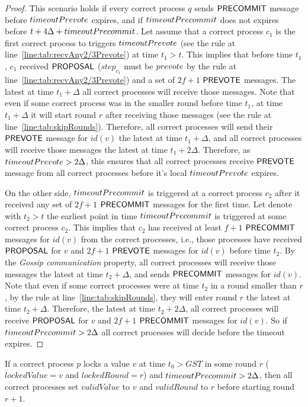 \begin{proof}
This scenario holds if every correct process $q$ sends $\mathsf{PRECOMMIT}$ message before $timeoutPrevote$ expires, and if $timeoutPrecommit$ does not expires before $t + 4\Delta + timeoutPrecommit$. 
Let assume that a correct process $c_1$ is the first correct process to triggers $timeoutPrevote$ (see the rule at line~\ref{line:tab:recvAny2/3Prevote}) at time $t_1 > t$. This implies that before time $t_1$, $c_1$ received $\mathsf{PROPOSAL}$ ($step_{c_1}$ must be $prevote$ by the rule at line~\ref{line:tab:recvAny2/3Prevote}) and a set of $2f+1$ $\mathsf{PREVOTE}$ messages.
The latest at time $t_1 + \Delta$ all correct processes will receive those messages. Note that even if some correct process was in the smaller round before time $t_1$, at time $t_1 + \Delta$ it will start round $r$ after receiving those messages (see the rule at line~\ref{line:tab:skipRounds}). 
Therefore, all correct processes will send their $\mathsf{PREVOTE}$ message for $id(v)$ the latest at time $t_1 + \Delta$, and all correct processes will receive those messages the latest at time $t_1 + 2\Delta$. 
Therefore, as $timeoutPrevote > 2\Delta$, this ensures that all correct processes receive $\mathsf{PREVOTE}$ message from all correct processes before it's local $timeoutPrevote$ expires.   

On the other side, $timeoutPrecommit$ is triggered at a correct process $c_2$ after it received any set of $2f+1$ $\mathsf{PRECOMMIT}$ messages for the first time. Let denote with $t_2 > t$ the earliest point in time $timeoutPrecommit$ is triggered at some correct process $c_2$. This implies that $c_2$ has received at least $f+1$ $\mathsf{PRECOMMIT}$ messages for $id(v)$ from the correct processes, i.e., those processes have received $\mathsf{PROPOSAL}$ for $v$ and $2f+1$ $\mathsf{PREVOTE}$ messages for $id(v)$ before time $t_2$. By the \emph{Gossip communication} property, all correct processes will receive those messages the latest at time $t_2 + \Delta$, and sends $\mathsf{PRECOMMIT}$ messages for $id(v)$. Note that even if some correct processes were at time $t_2$ in a round smaller than $r$,
by the rule at line~\ref{line:tab:skipRounds}, they will enter round $r$ the latest at time $t_2 + \Delta$.
Therefore, the latest at time $t_2 + 2\Delta$, all correct processes will receive $\mathsf{PROPOSAL}$ for $v$ and $2f+1$ $\mathsf{PRECOMMIT}$ messages for $id(v)$. So if $timeoutPrecommit > 2\Delta$ all correct processes will decide before the timeout expires.         
\end{proof}	


\begin{lemma}
	\label{lemma:validValue}
If a correct process $p$ locks a value $v$ at time $t_0 > GST$ in some round $r$ ($lockedValue = v$ and $lockedRound = r$) and $timeoutPrecommit> 2\Delta$, then all correct processes set $validValue$ to $v$ and $validRound$ to $r$ before starting round $r+1$. 
\end{lemma}
 
